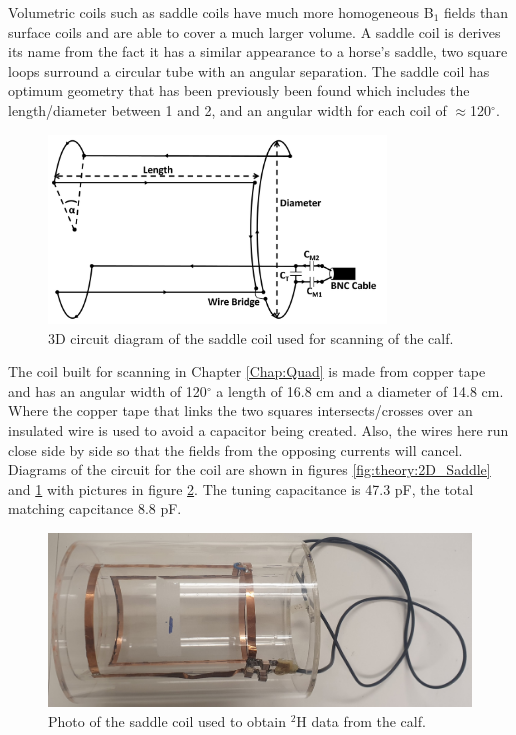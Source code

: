 \documentclass[class=article, crop=false]{standalone}
\begin{document}
Volumetric coils such as saddle coils have much more homogeneous B$_1$ fields than surface coils and are able to cover a much larger volume. A saddle coil is derives its name from the fact it has a similar appearance to a horse's saddle, two square loops surround a circular tube with an angular separation. The saddle coil has optimum geometry that has been previously been found which includes the length/diameter between 1 and 2, and an angular width for each coil of $\approx$120$^\circ$\cite{Ginsberg1970OptimumField,Salmon2006OptimizationImaging}.

\begin{figure}
    \centering
    \includegraphics[width=0.8\textwidth]{Figures/Theory/3D_Saddle.png}
    \caption{3D circuit diagram of the saddle coil used for scanning of the calf.}
    \label{fig:theory:3D_Saddle}
\end{figure}

The coil built for scanning in Chapter \ref{Chap:Quad} is made from copper tape and has an angular width of 120$^\circ$ a length of 16.8 cm and a diameter of 14.8 cm. Where the copper tape that links the two squares intersects/crosses over an insulated wire is used to avoid a capacitor being created. Also, the wires here run close side by side so that the fields from the opposing currents will cancel. Diagrams of the circuit for the coil are shown in figures \ref{fig:theory:2D_Saddle} and \ref{fig:theory:3D_Saddle} with pictures in figure \ref{fig:theory:Saddle_pic}. The tuning capacitance is 47.3 pF, the total matching capcitance 8.8 pF.

\begin{figure}
    \centering
    \includegraphics[width=1\textwidth]{Figures/Theory/Saddle_Coil.jpg}
    \caption{Photo of the saddle coil used to obtain $^2$H data from the calf.}
    \label{fig:theory:Saddle_pic}
\end{figure}
\end{document}
